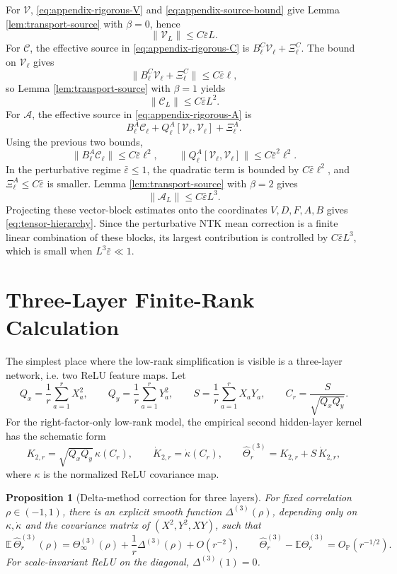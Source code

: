 \documentclass{article}
\newtheorem{proposition}[theorem]{Proposition}
\newcommand{\E}{\mathbb E}
\newcommand{\Pp}{\mathbb P}
\newcommand{\wh}{\widehat}
\newcommand{\barE}{\bar\varepsilon}
\begin{document}
For \(\mathcal V\), \eqref{eq:appendix-rigorous-V} and \eqref{eq:appendix-source-bound} give Lemma \ref{lem:transport-source} with \(\beta=0\), hence
\[
\|\mathcal V_L\|\le C\barE L.
\]
For \(\mathcal C\), the effective source in \eqref{eq:appendix-rigorous-C} is \(B^C_\ell\mathcal V_\ell+\Xi^C_\ell\). The bound on \(\mathcal V_\ell\) gives
\[
\|B^C_\ell\mathcal V_\ell+\Xi^C_\ell\|
\le C\barE \ell,
\]
so Lemma \ref{lem:transport-source} with \(\beta=1\) yields
\[
\|\mathcal C_L\|\le C\barE L^2.
\]
For \(\mathcal A\), the effective source in \eqref{eq:appendix-rigorous-A} is
\[
B^A_\ell\mathcal C_\ell
+Q^A_\ell[\mathcal V_\ell,\mathcal V_\ell]
+\Xi^A_\ell.
\]
Using the previous two bounds,
\[
\|B^A_\ell\mathcal C_\ell\|
\le C\barE \ell^2,
\qquad
\|Q^A_\ell[\mathcal V_\ell,\mathcal V_\ell]\|
\le C\barE^2\ell^2.
\]
In the perturbative regime \(\barE\le1\), the quadratic term is bounded by \(C\barE\ell^2\), and \(\Xi^A_\ell\le C\barE\) is smaller. Lemma \ref{lem:transport-source} with \(\beta=2\) gives
\[
\|\mathcal A_L\|\le C\barE L^3.
\]
Projecting these vector-block estimates onto the coordinates \(V,D,F,A,B\) gives \eqref{eq:tensor-hierarchy}. Since the perturbative NTK mean correction is a finite linear combination of these blocks, its largest contribution is controlled by \(C\barE L^3\), which is small when \(L^3\barE\ll1\).

\section{Three-Layer Finite-Rank Calculation}
\label{app:three-layer-delta}
The simplest place where the low-rank simplification is visible is a three-layer network, i.e. two ReLU feature maps. Let
\[
Q_x=\frac1r\sum_{a=1}^{r}X_a^2,\qquad
Q_y=\frac1r\sum_{a=1}^{r}Y_a^2,\qquad
S=\frac1r\sum_{a=1}^{r}X_aY_a,
\qquad
C_r=\frac{S}{\sqrt{Q_xQ_y}}.
\]
For the right-factor-only low-rank model, the empirical second hidden-layer kernel has the schematic form
\[
K_{2,r}=\sqrt{Q_xQ_y}\,\kappa(C_r),
\qquad
\dot K_{2,r}=\dot\kappa(C_r),
\qquad
\wh\Theta^{(3)}_r=K_{2,r}+S\,\dot K_{2,r},
\]
where \(\kappa\) is the normalized ReLU covariance map.

\begin{proposition}[Delta-method correction for three layers]
\label{prop:three-layer-delta}
For fixed correlation \(\rho\in(-1,1)\), there is an explicit smooth function \(\Delta^{(3)}(\rho)\), depending only on \(\kappa,\dot\kappa\) and the covariance matrix of \((X^2,Y^2,XY)\), such that
\begin{equation}
\E\,\wh\Theta^{(3)}_r(\rho)
=\Theta^{(3)}_\infty(\rho)+\frac1r\Delta^{(3)}(\rho)+O(r^{-2}),
\qquad
\wh\Theta^{(3)}_r-\E\wh\Theta^{(3)}_r=O_{\Pp}(r^{-1/2}).
\label{eq:three-layer-delta}
\end{equation}
For scale-invariant ReLU on the diagonal, \(\Delta^{(3)}(1)=0\).
\end{proposition}
\end{document}
